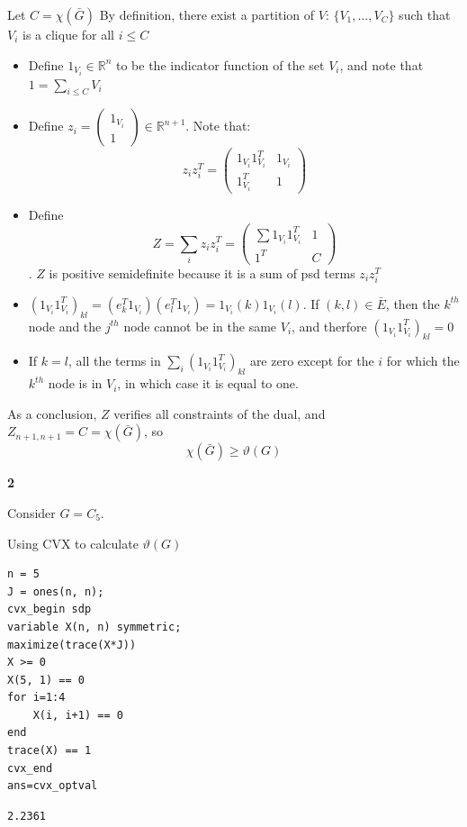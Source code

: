 \documentclass[11pt]{article}
\begin{document}
Let \(C = \chi(\bar G)\)
By definition, there exist a partition of \(V\): \(\{V_1, \ldots, V_C\}\) such that \(V_i\) is a clique for all \(i \le C\)
\begin{itemize}
\item Define \(1_{V_i} \in \mathbb R^n\) to be the indicator function of the set \(V_i\), and note that \(1 = \sum_{i \le C} V_i\)
\item Define \(z_i = \begin{pmatrix}1_{V_i}\\1\end{pmatrix} \in \mathbb R^{n+1}\). Note that:
$$z_iz_i^T = \begin{pmatrix}1_{V_i}1_{V_i}^T&1_{V_i}\\1^T_{V_i}&1\end{pmatrix}$$
\item Define $$Z = \sum_{i} z_iz_i^T = \begin{pmatrix}\sum 1_{V_i}1_{V_i}^T&1\\1^T&C\end{pmatrix}$$. \(Z\) is positive semidefinite because it is a sum of psd terms \(z_iz_i^T\)
\item \((1_{V_i}1_{V_i}^T)_{kl} = (e_k^T1_{V_i})(e_l^T1_{V_i}) = 1_{V_i}(k) 1_{V_i}(l)\). If \((k, l) \in \bar E\), then the \(k^{th}\) node and the \(j^{th}\) node cannot be in the same \(V_i\), and therfore \((1_{V_i}1_{V_i}^T)_{kl} = 0\)
\item If \(k = l\), all the terms in \(\sum_i (1_{V_i}1_{V_i}^T)_{kl}\) are zero except for the \(i\) for which the \(k^{th}\) node is in \(V_i\), in which case it is equal to one.
\end{itemize}

As a conclusion, \(Z\) verifies all constraints of the dual, and \(Z_{n+1, n+1} = C = \chi(\bar G)\), so $$\chi(\bar G) \ge \vartheta(G)$$


\textbf{2}

Consider \(G = C_5\).

Using CVX to calculate \(\vartheta(G)\)
\begin{verbatim}
n = 5
J = ones(n, n);
cvx_begin sdp
variable X(n, n) symmetric;
maximize(trace(X*J))
X >= 0
X(5, 1) == 0
for i=1:4
    X(i, i+1) == 0
end
trace(X) == 1
cvx_end
ans=cvx_optval
\end{verbatim}

\begin{verbatim}
2.2361
\end{verbatim}
\end{document}
